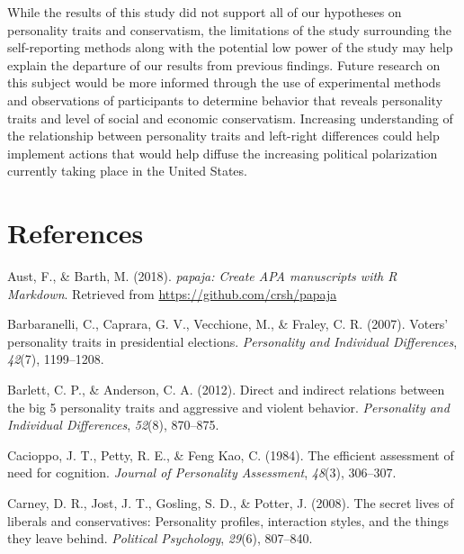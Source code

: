 \documentclass[man]{apa6}
\begin{document}
While the results of this study did not support all of our hypotheses on personality traits and conservatism, the limitations of the study surrounding the self-reporting methods along with the potential low power of the study may help explain the departure of our results from previous findings. Future research on this subject would be more informed through the use of experimental methods and observations of participants to determine behavior that reveals personality traits and level of social and economic conservatism. Increasing understanding of the relationship between personality traits and left-right differences could help implement actions that would help diffuse the increasing political polarization currently taking place in the United States.

\newpage

\hypertarget{references}{%
\section{References}\label{references}}

\begingroup
\setlength{\parindent}{-0.5in}
\setlength{\leftskip}{0.5in}

\hypertarget{refs}{}
\leavevmode\hypertarget{ref-R-papaja}{}%
Aust, F., \& Barth, M. (2018). \emph{papaja: Create APA manuscripts with R Markdown}. Retrieved from \url{https://github.com/crsh/papaja}

\leavevmode\hypertarget{ref-barbaranelli2007voters}{}%
Barbaranelli, C., Caprara, G. V., Vecchione, M., \& Fraley, C. R. (2007). Voters' personality traits in presidential elections. \emph{Personality and Individual Differences}, \emph{42}(7), 1199--1208.

\leavevmode\hypertarget{ref-barlett2012direct}{}%
Barlett, C. P., \& Anderson, C. A. (2012). Direct and indirect relations between the big 5 personality traits and aggressive and violent behavior. \emph{Personality and Individual Differences}, \emph{52}(8), 870--875.

\leavevmode\hypertarget{ref-cacioppo1984efficient}{}%
Cacioppo, J. T., Petty, R. E., \& Feng Kao, C. (1984). The efficient assessment of need for cognition. \emph{Journal of Personality Assessment}, \emph{48}(3), 306--307.

\leavevmode\hypertarget{ref-carney2008secret}{}%
Carney, D. R., Jost, J. T., Gosling, S. D., \& Potter, J. (2008). The secret lives of liberals and conservatives: Personality profiles, interaction styles, and the things they leave behind. \emph{Political Psychology}, \emph{29}(6), 807--840.
\end{document}
